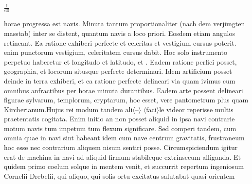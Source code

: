 $\displaystyle\frac{1}{60}$\rule[-4mm]{0mm}{10mm} horae progressa est navis\protect{}. Minuta tantum proportionaliter (nach dem verj\"{u}ngten masstab) inter se distent, quantum navis\protect{} a loco priori. Eosdem etiam angulos retineant. Ea ratione exhiberi perfecte et celeritas\protect{} et vestigium cursus poterit.  enim punctorum vestigium,  celeritatem\protect{} cursus dabit. Hoc solo instrumento perpetuo haberetur et longitudo\protect{} et latitudo\protect{}, et . Eadem ratione perfici posset, geographia, et locorum  situsque perfecte determinari. Idem artificium posset deinde in terra exhiberi, et ea ratione perfecte delineari via quam ivimus cum omnibus anfractibus per horae minuta  durantibus. Eadem arte possent delineari figurae sylvarum, templorum, cryptarum, hoc esset, vere pantometrum plus quam Kircherianum.\pend \pstart Hujus rei modum tandem ali$\langle$--$\rangle$ $\langle$faci$\rangle$le videor reperisse multis praetentatis cogitata. Enim initio an non posset aliquid in ipsa navi\protect{} contrarie motum navis\protect{} tum impetum tum flexum significare. Sed comperi tandem, cum omnia quae in navi\protect{} sint habeant idem cum nave\protect{} centrum gravitatis\protect{}, frustraneum hoc esse nec contrarium aliquem nisum sentiri posse. Circumspiciendum igitur erat de machina in navi\protect{} ad aliquid firmum stabileque extrinsecum alliganda. Et quidem primo coelum solque\protect{} in mentem venit, et succurrit repertum ingeniosum Cornelii Drebelii\protect{}, qui  aliquo, qui solis\protect{} ortu excitatus salutabat quasi orientem 